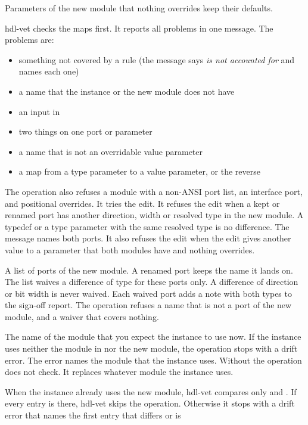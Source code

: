 \begin{entry}{}
\begin{itemize}
    Parameters of the new module that nothing overrides keep their defaults.
  \end{itemize}
\item[Refused] hdl-vet checks the maps first. It reports all problems in one
  message. The problems are:
  \begin{itemize}
  \item something not covered by a rule (the message says \emph{is not accounted for} and
    names each one)
  \item a name that the instance or the new module does not have
  \item an input in 
  \item two things on one port or parameter
  \item a  name that is not an overridable value parameter
  \item a  map from a type parameter to a value parameter, or the reverse
  \end{itemize}
  The operation also refuses a module with a non-ANSI port list, an interface port, and
  positional overrides. It tries the edit. It refuses the edit when a kept or renamed port
  has another direction, width or resolved type in the new module. A typedef or a type
  parameter with the same resolved type is no difference. The message names both ports.
  It also refuses the edit when the edit gives another value to a parameter that both modules
  have and nothing overrides.
\item[accept\_types] A list of ports of the new module. A renamed port keeps the name it
  lands on. The list waives a difference of type for these ports only. A difference of
  direction or bit width is never waived. Each waived port adds a note with both types to the
  sign-off report. The operation refuses a name that is not a port of the new module, and a
  waiver that covers nothing.
\item[was] The name of the module that you expect the instance to use now. If the
  instance uses neither the module in  nor the new module, the operation
  stops with a drift error. The error names the module that the instance uses. Without
   the operation does not check. It replaces whatever module the instance uses.
\item[Again] When the instance already uses the new module, hdl-vet compares only
   and . If every entry is there, hdl-vet skips the operation.
  Otherwise it stops with a drift error that names the first entry that differs or is

\end{entry}
